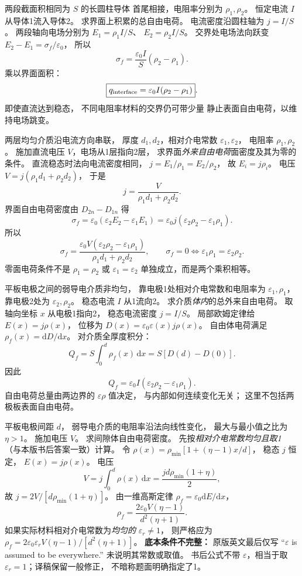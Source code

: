 两段截面积相同为 $S$ 的长圆柱导体
首尾相接，电阻率分别为 $\rho_1,\rho_2$。
恒定电流 $I$ 从导体1流入导体2。
求界面上积累的总自由电荷。
\exsolution
电流密度沿圆柱轴为
$j=I/S$。
两段轴向电场分别为
$E_1=\rho_1I/S$、
$E_2=\rho_2I/S$。
交界处电场法向跃变
$E_2-E_1=\sigma_f/\varepsilon_0$，
所以
\[
\sigma_f=\frac{\varepsilon_0 I}{S}
(\rho_2-\rho_1).
\]
乘以界面面积：
\[
\boxed{q_{\rm interface}=
\varepsilon_0 I(\rho_2-\rho_1)}.
\]
\excheck 即使直流达到稳态，
不同电阻率材料的交界仍可带少量
静止表面自由电荷，以维持电场跳变。

两层均匀介质沿电流方向串联，
厚度 $d_1,d_2$，相对介电常数
$\varepsilon_1,\varepsilon_2$，
电阻率 $\rho_1,\rho_2$。
施加直流电压 $V$，电场从1层指向2层，
求界面\emph{外来自由电荷}面密度及其为零的条件。
\exsolution
直流稳态时法向电流密度相同，
$j=E_1/\rho_1=E_2/\rho_2$，
故 $E_i=j\rho_i$。
电压
$V=j(\rho_1d_1+\rho_2d_2)$，
于是
\[
j=\frac{V}{\rho_1d_1+\rho_2d_2}.
\]
界面自由电荷密度由
$D_{2n}-D_{1n}$ 得
\[
\sigma_f=\varepsilon_0
(\varepsilon_2E_2-\varepsilon_1E_1)
=\varepsilon_0j
(\varepsilon_2\rho_2-\varepsilon_1\rho_1).
\]
所以
\[
\boxed{\sigma_f=
\frac{\varepsilon_0V
(\varepsilon_2\rho_2-\varepsilon_1\rho_1)}
{\rho_1d_1+\rho_2d_2}},
\qquad
\boxed{\sigma_f=0\iff
\varepsilon_1\rho_1=\varepsilon_2\rho_2}.
\]
\excheck 零面电荷条件不是
$\rho_1=\rho_2$ 或 $\varepsilon_1=\varepsilon_2$
单独成立，而是两个乘积相等。

平板电极之间的弱导电介质非均匀，
靠电极1处相对介电常数和电阻率为
$\varepsilon_1,\rho_1$，
靠电极2处为 $\varepsilon_2,\rho_2$。
稳态电流 $I$ 从1流向2。
求介质\emph{体内}的总外来自由电荷。
\exsolution
取轴向坐标 $x$ 从电极1指向2，
稳态电流密度 $j=I/S$。
局部欧姆定律给 $E(x)=j\rho(x)$，
位移为
$D(x)=\varepsilon_0\varepsilon(x)j\rho(x)$。
自由体电荷满足
$\rho_f(x)=\mathrm dD/\mathrm dx$。
对介质全厚度积分：
\[
Q_f=S\int_0^d\rho_f(x)\,\mathrm dx
=S[D(d)-D(0)].
\]
因此
\[
\boxed{Q_f=
\varepsilon_0I
(\varepsilon_2\rho_2-\varepsilon_1\rho_1)}.
\]
\excheck 自由电荷总量由两边界的
$\varepsilon\rho$ 值决定，
与内部如何连续变化无关；
这里不包括两极板表面自由电荷。

平板电极间距 $d$，
弱导电介质的电阻率沿法向线性变化，
最大与最小值之比为 $\eta>1$。
施加电压 $V$。
求间隙体自由电荷密度。
\exsolution
先按\emph{相对介电常数均匀且取1}
（与本版书后答案一致）计算。
令 $\rho(x)=\rho_{\min}
[1+(\eta-1)x/d]$，
稳态 $j$ 恒定，
$E(x)=j\rho(x)$。
电压
\[
V=j\int_0^d\rho(x)\,\mathrm dx
=\frac{jd\rho_{\min}(1+\eta)}2,
\]
故
$j=2V/[d\rho_{\min}(1+\eta)]$。
由一维高斯定律
$\rho_f=\varepsilon_0\mathrm dE/\mathrm dx$，
\[
\boxed{\rho_f=
\frac{2\varepsilon_0V(\eta-1)}
{d^2(\eta+1)}}.
\]
如果实际材料相对介电常数为\emph{均匀的}
$\varepsilon_r\ne1$，
则严格应为
$\rho_f=2\varepsilon_0\varepsilon_rV
(\eta-1)/[d^2(\eta+1)]$。
\excheck \textbf{底本条件不完整：}
原版英文最后仅写
“$\varepsilon$ is assumed to be everywhere.”
未说明其常数或取值。
书后公式不带 $\varepsilon$，相当于取
$\varepsilon_r=1$；译稿保留一般修正，
不暗称题面明确指定了1。

